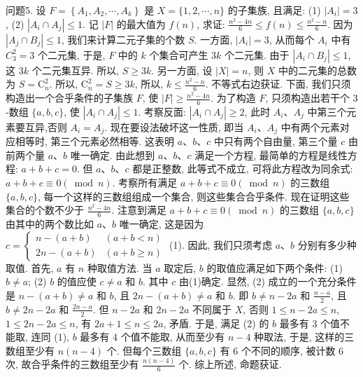 问题5. 设 $F=\left\{A_1, A_2, \cdots, A_k\right\}$ 是 $X=\{1,2, \cdots, n\}$ 的子集族, 且满足:
(1) $\left|A_i\right|=3$, (2) $\left|A_i \cap A_j\right| \leqslant 1$. 记 $|F|$ 的最大值为 $f(n)$, 求证: $\frac{n^2-4 n}{6} \leqslant f(n) \leqslant \frac{n^2-n}{6}$. 
因为 $\left|A_j \cap B_j\right| \leqslant 1$, 我们来计算二元子集的个数 $S$. 一方面, $\left|A_i\right|=3$, 从而每个 $A_i$ 中有 $C_3^2=3$ 个二元集, 于是, $F$ 中的 $k$ 个集合可产生 $3 k$ 个二元集.
由于 $\left|A_i \cap B_j\right| \leqslant 1$, 这 $3 k$ 个二元集互异.
所以, $S \geqslant 3 k$. 另一方面, 设 $|X|=n$, 则 $X$ 中的二元集的总数为 $S=\mathrm{C}_n^2$. 所以, $\mathrm{C}_n^2=S \geqslant 3 k$, 所以, $k \leqslant \frac{n^2-n}{6}$. 不等式右边获证.
下面, 我们只须构造出一个合乎条件的子集族 $F$, 使 $|F| \geqslant \frac{n^2-4 n}{6}$. 为了构造 $F$, 只须构造出若干个 3 -数组 $\{a, b, c\}$, 使 $\left|A_i \cap A_j\right| \leqslant 1$. 考察反面: $\left|A_i \cap A_j\right| \geqslant 2$, 此时 $A_i 、 A_j$ 中第三个元素要互异,否则 $A_i=A_j$. 现在要设法破坏这一性质, 即当 $A_i 、 A_j$ 中有两个元素对应相等时, 第三个元素必然相等.
这表明 $a 、 b 、 c$ 中只有两个自由量, 第三个量 $c$ 由前两个量 $a 、 b$ 唯一确定.
由此想到 $a 、 b 、 c$ 满足一个方程, 最简单的方程是线性方程: $a+b+c=0$. 但 $a 、 b 、 c$ 都是正整数, 此等式不成立, 可将此方程改为同余式: $a+b+c \equiv 0(\bmod n)$. 考察所有满足 $a+b+c \equiv 0(\bmod n)$ 的三数组 $\{a, b, c\}$, 每一个这样的三数组组成一个集合, 则这些集合合乎条件.
现在证明这些集合的个数不少于 $\frac{n^2-4 n}{6}$. 注意到满足 $a+b+c \equiv 0(\bmod n)$ 的三数组 $\{a, b, c\}$ 由其中的两个数比如 $a 、 b$ 唯一确定, 这是因为 $c= \left\{\begin{array}{ll}n-(a+b) & (a+b<n) \\ 2 n-(a+b) & (a+b \geqslant n)\end{array}\right.$ (1). 因此, 我们只须考虑 $a 、 b$ 分别有多少种取值.
首先, $a$ 有 $n$ 种取值方法.
当 $a$ 取定后, $b$ 的取值应满足如下两个条件: (1) $b \neq a$; (2) $b$ 的值应使 $c \neq a$ 和 $b$. 其中 $c$ 由(1)确定.
显然, (2) 成立的一个充分条件是 $n-(a+b) \neq a$ 和 $b$, 且 $2 n-(a+b) \neq a$ 和 $b$. 即 $b \neq n-2 a$ 和 $\frac{n-a}{2}$, 且 $b \neq 2 n-2 a$ 和 $\frac{2 n-a}{2}$. 但 $n-2 a$ 和 $2 n-2 a$ 不同属于 $X$, 否则 $1 \leqslant n-2 a \leqslant n$, $1 \leqslant 2 n-2 a \leqslant n$, 有 $2 a+1 \leqslant n \leqslant 2 a$, 矛盾.
于是, 满足 (2) 的 $b$ 最多有 3 个值不能取, 连同 (1), $b$ 最多有 4 个值不能取, 从而至少有 $n-4$ 种取法, 于是, 这样的三数组至少有 $n(n-4)$ 个.
但每个三数组 $\{a, b, c\}$ 有 6 个不同的顺序, 被计数 6 次, 故合乎条件的三数组至少有 $\frac{n(n-4)}{6}$ 个.
综上所述, 命题获证.



